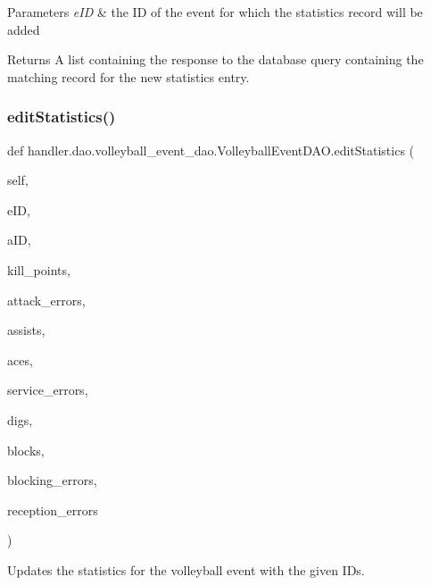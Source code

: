 \begin{DoxyParams}{Parameters}
{\em e\+ID} & the ID of the event for which the statistics record will be added\\
\hline
\end{DoxyParams}
\begin{DoxyReturn}{Returns}
A list containing the response to the database query containing the matching record for the new statistics entry. 
\end{DoxyReturn}
\mbox{\label{classhandler_1_1dao_1_1volleyball__event__dao_1_1_volleyball_event_d_a_o_a8aac4d289e02c18f44c0780b5fdb5941}} 
\subsubsection{\texorpdfstring{edit\+Statistics()}{editStatistics()}}
{\footnotesize\ttfamily def handler.\+dao.\+volleyball\+\_\+event\+\_\+dao.\+Volleyball\+Event\+D\+A\+O.\+edit\+Statistics (\begin{DoxyParamCaption}\item[{}]{self,  }\item[{}]{e\+ID,  }\item[{}]{a\+ID,  }\item[{}]{kill\+\_\+points,  }\item[{}]{attack\+\_\+errors,  }\item[{}]{assists,  }\item[{}]{aces,  }\item[{}]{service\+\_\+errors,  }\item[{}]{digs,  }\item[{}]{blocks,  }\item[{}]{blocking\+\_\+errors,  }\item[{}]{reception\+\_\+errors }\end{DoxyParamCaption})}



Updates the statistics for the volleyball event with the given I\+Ds. 

